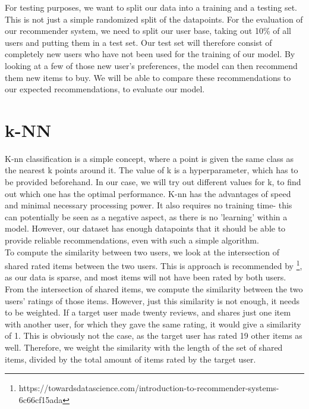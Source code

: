 \documentclass[11pt]{article}
\begin{document}
For testing purposes, we want to split our data into a training and a testing set. This is not just a simple randomized split of the datapoints. For the evaluation of our recommender system, we need to split our user base, taking out 10\% of all users and putting them in a test set. Our test set will therefore consist of completely new users who have not been used for the training of our model. By looking at a few of those new user's preferences, the model can then recommend them new items to buy. We will be able to compare these recommendations to our expected recommendations, to evaluate our model.

\section{k-NN}
K-nn classification is a simple concept, where a point is given the same class as the nearest k points around it. The value of k is a hyperparameter, which has to be provided beforehand. In our case, we will try out different values for k, to find out which one has the optimal performance. K-nn has the advantages of speed and minimal necessary processing power. It also requires no training time- this can potentially be seen as a negative aspect, as there is no 'learning' within a model. However, our dataset has enough datapoints that it should be able to provide reliable recommendations, even with such a simple algorithm.\\
To compute the similarity between two users, we look at the intersection of shared rated items between the two users. This is approach is recommended by \footnote[1]{https://towardsdatascience.com/introduction-to-recommender-systems-6c66cf15ada}, as our data is sparse, and most items will not have been rated by both users. From the intersection of shared items, we compute the similarity between the two users' ratings of those items. However, just this similarity is not enough, it needs to be weighted. If a target user made twenty reviews, and shares just one item with another user, for which they gave the same rating, it would give a similarity of 1. This is obviously not the case, as the target user has rated 19 other items as well. Therefore, we weight the similarity with the length of the set of shared items, divided by the total amount of items rated by the target user.
\end{document}
